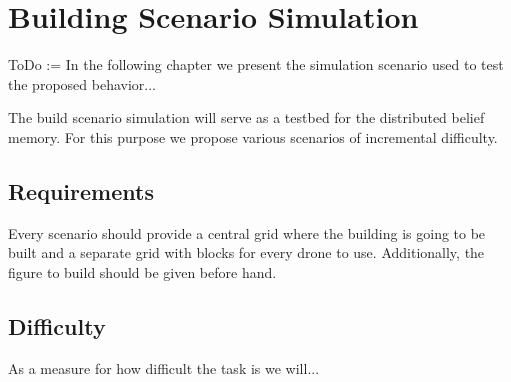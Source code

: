 \chapter{Building Scenario Simulation}

  ToDo := In the following chapter we present the simulation scenario used to test the proposed behavior...

  The build scenario simulation will serve as a testbed for the distributed belief memory. For this purpose we propose various scenarios of incremental difficulty.

  \section{Requirements}

    Every scenario should provide a central grid where the building is going to be built and a separate grid with blocks for every drone to use. Additionally, the figure to build should be given before hand.

  \section{Difficulty}

    As a measure for how difficult the task is we will...

